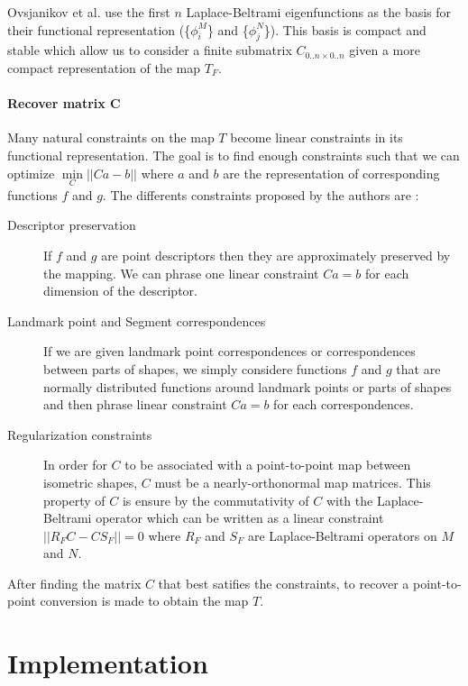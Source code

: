 \documentclass[10pt,twocolumn,letterpaper]{article}
\begin{document}
Ovsjanikov et al. use the first $n$ Laplace-Beltrami eigenfunctions as the basis for their functional representation (\{$\phi_i^M$\} and \{$\phi_j^N$\}). This basis is compact and stable which allow us to consider a finite submatrix $C_{0..n \times 0..n}$ given a more compact representation of the map $T_F$. 

\paragraph{Recover matrix C} 
Many natural constraints on the map $T$ become linear constraints in its functional representation. The goal is to find enough constraints such that we can optimize $\underset{C}{\min}||Ca-b||$ where $a$ and $b$ are the representation of corresponding functions $f$ and $g$. The differents constraints proposed by the authors are : 
\begin{description}
\item[Descriptor preservation] If $f$ and $g$ are point descriptors then they are approximately preserved by the mapping. We can phrase one linear constraint $Ca=b$ for each dimension of the descriptor.
\item[Landmark point and Segment correspondences] If we are given landmark point correspondences or correspondences between parts of shapes, we simply considere functions $f$ and $g$ that are normally distributed functions around landmark points or parts of shapes and then phrase linear constraint $Ca=b$ for each correspondences.
\item[Regularization constraints] In order for $C$ to be associated with a point-to-point map between isometric shapes, $C$ must be a nearly-orthonormal map matrices. This property of $C$ is ensure by the commutativity of $C$ with the Laplace-Beltrami operator which can be written as a linear constraint $||R_FC-CS_F||=0$ where $R_F$ and $S_F$ are Laplace-Beltrami operators on $M$ and $N$.
\end{description}

After finding the matrix $C$ that best satifies the constraints, to recover a point-to-point conversion is made to obtain the map $T$.

\section{Implementation}
\end{document}
